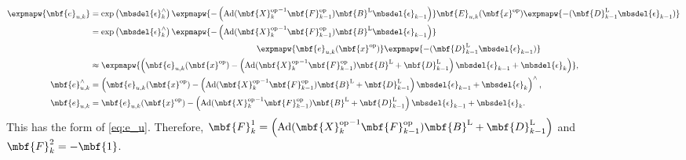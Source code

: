 \begin{align*}
	\expmapw{\mbf{e}_{u,k}} &= \exp\left(\mbsdel{\epsilon}_k^\wedge\right)\expmapw{-\left(\textrm{Ad}({\mbf{X}_k^\textrm{op}}^{-1} \mbf{F}_{k-1}^\textrm{op})\mbf{B}^\textrm{L}\mbsdel{\epsilon}_{k-1}\right)}\mbf{E}_{u,k}(\mbf{x}^\textrm{op})\expmapw{-(\mbf{D}_{k-1}^\textrm{L}\mbsdel{\epsilon}_{k-1})}\\
	 &= \exp\left(\mbsdel{\epsilon}_k^\wedge\right)\expmapw{-\left(\textrm{Ad}({\mbf{X}_k^\textrm{op}}^{-1} \mbf{F}_{k-1}^\textrm{op})\mbf{B}^\textrm{L}\mbsdel{\epsilon}_{k-1}\right)}\notag \\
	 & \qquad \qquad \qquad \qquad \qquad \qquad \qquad \qquad \qquad \qquad \expmapw{\mbf{e}_{u,k}(\mbf{x}^\textrm{op})}\expmapw{-(\mbf{D}_{k-1}^\textrm{L}\mbsdel{\epsilon}_{k-1})}\\
	 &\approx \expmapw{\left(\mbf{e}_{u,k}(\mbf{x}^\textrm{op}) - \left(\textrm{Ad}({\mbf{X}_k^\textrm{op}}^{-1} \mbf{F}_{k-1}^\textrm{op})\mbf{B}^\textrm{L} + \mbf{D}_{k-1}^\textrm{L}\right)\mbsdel{\epsilon}_{k-1} + \mbsdel{\epsilon}_k\right)}, \\
	 \mbf{e}_{u,k}^\wedge &= \left(\mbf{e}_{u,k}(\mbf{x}^\textrm{op}) -  \left(\textrm{Ad}({\mbf{X}_k^\textrm{op}}^{-1} \mbf{F}_{k-1}^\textrm{op})\mbf{B}^\textrm{L} + \mbf{D}_{k-1}^\textrm{L}\right)\mbsdel{\epsilon}_{k-1} + \mbsdel{\epsilon}_k\right)^\wedge, \\
	 \mbf{e}_{u,k} &= \mbf{e}_{u,k}(\mbf{x}^\textrm{op}) - \left(\textrm{Ad}({\mbf{X}_k^\textrm{op}}^{-1} \mbf{F}_{k-1}^\textrm{op})\mbf{B}^\textrm{L} + \mbf{D}_{k-1}^\textrm{L}\right)\mbsdel{\epsilon}_{k-1} + \mbsdel{\epsilon}_k.
\end{align*}
This has the form of \eqref{eq:e_u}. Therefore, $\mbf{F}_k^1 = \left(\textrm{Ad}({\mbf{X}_k^\textrm{op}}^{-1} \mbf{F}_{k-1}^\textrm{op})\mbf{B}^\textrm{L} + \mbf{D}_{k-1}^\textrm{L}\right)$ and $\mbf{F}_k^2 = -\mbf{1}$.




